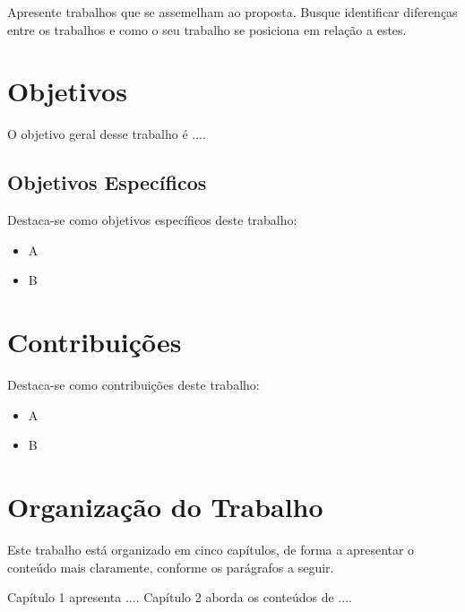 \documentclass[
12pt,				%
openright,			%
oneside,			%
a4paper,			%
english,			%
french,				%
spanish,			%
brazil				%
]{abntex2}
\begin{document}
Apresente trabalhos que se assemelham ao proposta. Busque identificar diferenças entre os trabalhos e como o seu trabalho se posiciona em relação a estes.

\section{Objetivos}
\label{sec:objetivos}
O objetivo geral desse trabalho é ....

\subsection{Objetivos Específicos}
\label{sec:objetivos_especificos}

Destaca-se como objetivos específicos deste trabalho:

\begin{itemize}
    \item A
    \item B
\end{itemize}

\section{Contribuições}
\label{sec:contrib}

Destaca-se como contribuições deste trabalho:

\begin{itemize}	
       \item A
       \item B
\end{itemize}

\section{Organização do Trabalho}
\label{sec:organizacao}

Este trabalho está organizado em cinco capítulos, de forma a apresentar o conteúdo mais claramente, conforme os parágrafos a seguir.

Capítulo 1 apresenta ....
Capítulo 2 aborda os conteúdos de ....


	
\end{document}
